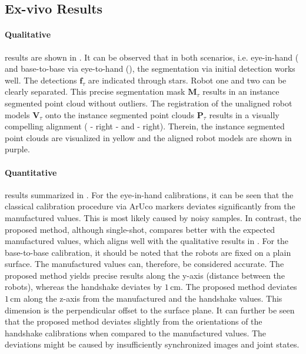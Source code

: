 \subsection{Ex-vivo Results}
\paragraph{Qualitative} results are shown in . It can be observed that in both scenarios, i.e. eye-in-hand ( and base-to-base via eye-to-hand (), the segmentation via initial detection works well. The detections $\mathbf{f}_\tau$ are indicated through stars. Robot one and two can be clearly separated. This precise segmentation mask $\mathbf{M}_\tau$ results in an instance segmented point cloud without outliers. The registration of the unaligned robot models $\mathbf{V}_\tau$ onto the instance segmented point clouds $\mathbf{P}_\tau$ results in a visually compelling alignment ( - right - and  - right). Therein, the instance segmented point clouds are visualized in yellow and the aligned robot models are shown in purple.

\paragraph{Quantitative} results summarized in . For the eye-in-hand calibrations, it can be seen that the classical calibration procedure via ArUco markers deviates significantly from the manufactured values. This is most likely caused by noisy samples. In contrast, the proposed method, although single-shot, compares better with the expected manufactured values, which aligns well with the qualitative results in . For the base-to-base calibration, it should be noted that the robots are fixed on a plain surface. The manufactured values can, therefore, be considered accurate. The proposed method yields precise results along the y-axis (distance between the robots), whereas the handshake deviates by $1\,\text{cm}$. The proposed method deviates $1\,\text{cm}$ along the z-axis from the manufactured and the handshake values. This dimension is the perpendicular offset to the surface plane. It can further be seen that the proposed method deviates slightly from the orientations of the handshake calibrations when compared to the manufactured values. The deviations might be caused by insufficiently synchronized images and joint states.

